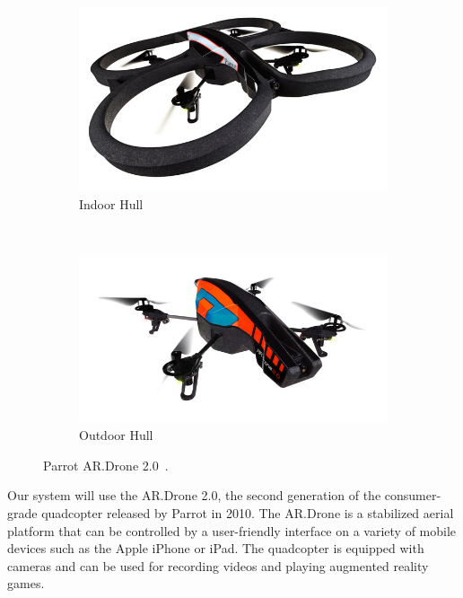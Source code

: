     \begin{figure}[ht]
            \centering
            \begin{subfigure}[b]{0.5\textwidth}
                    \centering
                    \includegraphics[width=\textwidth]{../images/ardrone_indoor.jpg}
                    \caption{Indoor Hull}
                    \label{fig:indoor}
            \end{subfigure}%
            ~ %
            \begin{subfigure}[b]{0.5\textwidth}
                    \centering
                    \includegraphics[width=\textwidth]{../images/ardrone_outdoor.jpg}
                    \caption{Outdoor Hull}
                    \label{fig:outdoor}
            \end{subfigure}
            \caption{Parrot AR.Drone 2.0~\cite{ParrotPress}.}\label{fig:ardrone}
    \end{figure}

    Our system will use the AR.Drone 2.0, the second generation of the consumer-grade quadcopter released by Parrot in 2010. The AR.Drone is a stabilized aerial platform that can be controlled by a user-friendly interface on a variety of mobile devices such as the Apple iPhone or iPad. The quadcopter is equipped with cameras and can be used for recording videos and playing augmented reality games.

